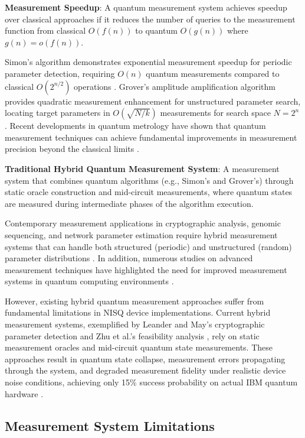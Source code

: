 \documentclass[journal]{IEEEtran}
\begin{document}
\textbf{Measurement Speedup}: A quantum measurement system achieves speedup over classical approaches if it reduces the number of queries to the measurement function from classical $O(f(n))$ to quantum $O(g(n))$ where $g(n) = o(f(n))$.

Simon's algorithm demonstrates exponential measurement speedup for periodic parameter detection, requiring $O(n)$ quantum measurements compared to classical $O(2^{n/2})$ operations \cite{365701}. Grover's amplitude amplification algorithm provides quadratic measurement enhancement for unstructured parameter search, locating target parameters in $O(\sqrt{N/k})$ measurements for search space $N=2^n$ \cite{grover1996fastquantummechanicalalgorithm}. Recent developments in quantum metrology have shown that quantum measurement techniques can achieve fundamental improvements in measurement precision beyond the classical limits \cite{Giovannetti_2011, 4303398}.

{\textbf{Traditional Hybrid Quantum Measurement System}: A measurement system that combines quantum algorithms (e.g., Simon's and Grover's) through static oracle construction and mid-circuit measurements, where quantum states are measured during intermediate phases of the algorithm execution.}

Contemporary measurement applications in cryptographic analysis, genomic sequencing, and network parameter estimation require hybrid measurement systems that can handle both structured (periodic) and unstructured (random) parameter distributions \cite{Callison_2022}. In addition, numerous studies on advanced measurement techniques have highlighted the need for improved measurement systems in quantum computing environments \cite{6312658, 9142431}.

However, existing hybrid quantum measurement approaches suffer from fundamental limitations in NISQ device implementations. {Current hybrid measurement systems, exemplified by Leander and May's cryptographic parameter detection \cite{10.1007/978-3-319-70697-9_6} and Zhu et al.'s feasibility analysis \cite{zhu2023feasibilityanalysisgrovermeetssimonalgorithm}, rely on static measurement oracles and mid-circuit quantum state measurements. These approaches result in quantum state collapse, measurement errors propagating through the system, and degraded measurement fidelity under realistic device noise conditions, achieving only 15\% success probability on actual IBM quantum hardware \cite{robertson2024simonsalgorithmnisqcloud}.}

\subsection{Measurement System Limitations}
\end{document}
